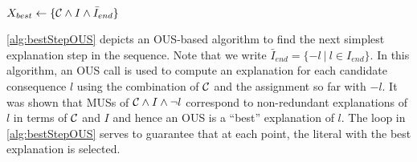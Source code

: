 \begin{algorithm}[ht]
  \caption{$\call{bestStep--OUS}({\cal C},f,I,I_{end})$}
  \label{alg:bestStepOUS}
$X_{best} \gets \{{\cal C} \land I \land \bar{I}_{end}\}$\;
\end{algorithm}

\cref{alg:bestStepOUS} depicts an OUS-based algorithm to find the next simplest explanation step in the sequence. 
Note that we write $\bar{I}_{end} = \{-l \ | \  l \in I_{end}\}$.
In this algorithm, an OUS call is used to compute an explanation for each candidate consequence $l$ using the combination of $\mathcal{C} $ and the assignment so far with $-l$. 
It was shown that MUSs of $\mathcal{C} \land I\land\lnot l$ correspond to non-redundant explanations of $l$ in terms of $\mathcal{C} $ and $I$ and hence an OUS is a ``best'' explanation of $l$. 
The loop in \cref{alg:bestStepOUS} serves to guarantee that at each point, the literal with the best explanation is selected. 





